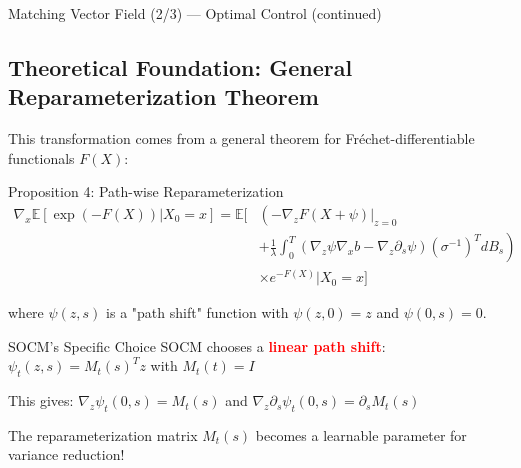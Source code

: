 \documentclass[aspectratio=169,xcolor=dvipsnames]{beamer}
\begin{document}
\begin{frame}[allowframebreaks]{Matching Vector Field (2/3) — Optimal Control (continued)}
    
    \subsection*{Theoretical Foundation: General Reparameterization Theorem}
    
    This transformation comes from a general theorem for Fréchet-differentiable functionals $F(X)$:
    
    \begin{alertblock}{Proposition 4: Path-wise Reparameterization}
        \begin{equation}
        \begin{aligned}
        \nabla_x \mathbb{E}[\exp(-F(X)) | X_0 = x] = \mathbb{E}\Bigg[
        &\left(-\nabla_z F(X + \psi)\big|_{z=0} \right. \\[4pt]
        &\left. + \frac{1}{\lambda}\int_0^T (\nabla_z \psi \nabla_x b - \nabla_z \partial_s \psi)(\sigma^{-1})^T dB_s\right) \\[4pt]
        &\times e^{-F(X)} \bigg| X_0 = x\Bigg]
        \end{aligned}
        \end{equation}
    \end{alertblock}
    
    where $\psi(z,s)$ is a "path shift" function with $\psi(z,0) = z$ and $\psi(0,s) = 0$.
    
    \vspace{0.8cm}
    
    \begin{block}{SOCM's Specific Choice}
        SOCM chooses a \textcolor{red}{\textbf{linear path shift}}: $\psi_t(z,s) = M_t(s)^T z$ with $M_t(t) = I$
        
        This gives: $\nabla_z \psi_t(0,s) = M_t(s)$ and $\nabla_z \partial_s \psi_t(0,s) = \partial_s M_t(s)$
        
        The reparameterization matrix $M_t(s)$ becomes a learnable parameter for variance reduction!
    \end{block}


\end{frame}
\end{document}
